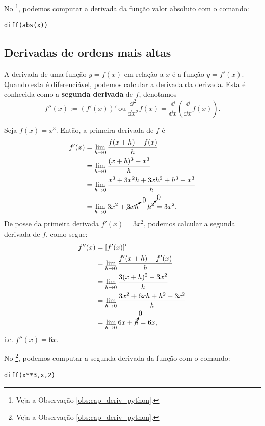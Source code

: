 \begin{ex}
  \ifispython
  No \sympy\footnote{Veja a Observação \ref{obs:cap_deriv_python}.}, podemos computar a derivada da função valor absoluto com o comando:
\begin{verbatim}
diff(abs(x))
\end{verbatim}
  \fi
\end{ex}

\subsection{Derivadas de ordens mais altas}

A derivada de uma função $y = f(x)$ em relação a $x$ é a função $y = f'(x)$. Quando esta é diferenciável, podemos calcular a derivada da derivada. Esta é conhecida como a {\bf segunda derivada} de $f$, denotamos
\begin{equation}
  f''(x) := (f'(x))' ~ \text{ou} ~ \frac{\dd^2}{\dd x^2}f(x) = \frac{\dd}{\dd x}\left(\frac{\dd}{\dd x}f(x)\right).
\end{equation}

\begin{ex}\label{ex:deriv_fll}
  Seja $f(x) = x^3$. Então, a primeira derivada de $f$ é
  \begin{align}
    f'(x) &= \lim_{h\to 0} \frac{f(x+h)-f(x)}{h} \\
          &= \lim_{h\to 0} \frac{(x+h)^3-x^3}{h}\\
          &= \lim_{h\to 0} \frac{x^3+3x^2h+3xh^2+h^3-x^3}{h}\\
          &= \lim_{h\to 0} 3x^2+\cancelto{0}{3xh}+\cancelto{0}{h^2} = 3x^2.
  \end{align}
  De posse da primeira derivada $f'(x) = 3x^2$, podemos calcular a segunda derivada de $f$, como segue:
  \begin{align}
    f''(x) &= [f'(x)]' \\
           &= \lim_{h\to 0} \frac{f'(x+h)-f'(x)}{h} \\
           &= \lim_{h\to 0} \frac{3(x+h)^2-3x^2}{h} \\
           &= \lim_{h\to 0} \frac{3x^2+6xh+h^2-3x^2}{h} \\
           &= \lim_{h\to 0} 6x+\cancelto{0}{h} = 6x,
  \end{align}
  i.e. $f''(x) = 6x$.

  \ifispython
  No \sympy\footnote{Veja a Observação \ref{obs:cap_deriv_python}.}, podemos computar a segunda derivada da função com o comando:
\begin{verbatim}
diff(x**3,x,2)
\end{verbatim}
  \fi  
\end{ex}

